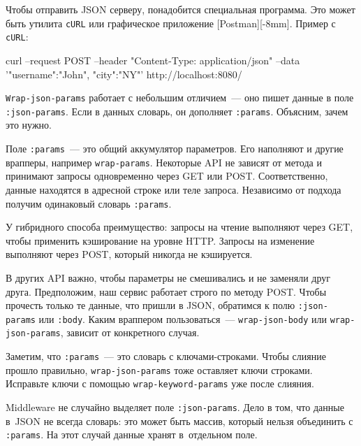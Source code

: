 
Чтобы отправить JSON серверу, понадобится специальная программа. Это может быть
утилита \verb|cURL| или графическое приложение
[Post\-man][-8mm]. Пример с \verb|cURL|:

\begin{english}
  \begin{bash}
curl --request POST
     --header "Content-Type:
                 application/json"
     --data '{"username":"John",
                      "city":"NY"}'
     http://localhost:8080/
  \end{bash}
\end{english}

\mnoindent
\verb|Wrap-json-params| работает с небольшим отличием~--- оно пишет данные в
поле \verb|:json-params|. Если в данных словарь, он дополняет
\verb|:params|. Объясним, зачем это нужно.

Поле \verb|:params|~--- это общий аккумулятор параметров. Его наполняют и другие
врапперы, например \verb|wrap-params|. Некоторые API не зависят от метода и
принимают запросы одновременно через GET или POST. Соответственно, данные
находятся в адресной строке или теле запроса. Независимо от подхода получим
одинаковый словарь \verb|:params|.

У гибридного способа преимущество: запросы на чтение выполняют через GET, чтобы
применить кэширование на уровне HTTP. Запросы на изменение выполняют через POST,
который никогда не кэшируется.

В других API важно, чтобы параметры не смешивались и не заменяли друг
друга. Предположим, наш сервис работает строго по методу POST. Чтобы прочесть
только те данные, что пришли в JSON, обратимся к полю \verb|:json-params| или
\verb|:body|. Каким враппером пользоваться~--- \verb|wrap-json-body| или
\verb|wrap-json-params|, зависит от конкретного случая.


Заметим, что \verb|:params|~--- это словарь с ключами-строками. Чтобы слияние
прошло правильно, \verb|wrap-json-params| тоже оставляет ключи
строками. Исправьте ключи с помощью \verb|wrap-keyword-params| уже после
слияния.

Middleware не случайно выделяет поле \verb|:json-params|. Дело в том, что данные
в~JSON не всегда словарь: это может быть массив, который нельзя объединить с
\verb|:params|. На этот случай данные хранят в~отдельном поле.

